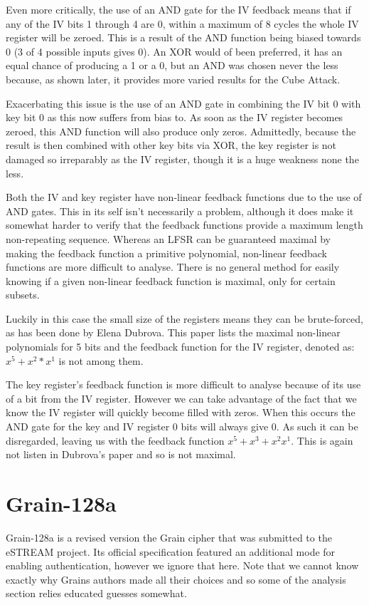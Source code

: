 \documentclass{report}
\let\Oldsection\section
\renewcommand{\section}{\FloatBarrier\Oldsection}
\begin{document}
Even more critically, the use of an AND gate for the IV feedback means that if any  of the IV bits 1 through 4 are 0, within a maximum of 8 cycles the whole IV register will be zeroed. This is a result of the AND function being biased towards 0 (3 of 4 possible inputs gives 0). An XOR would of been preferred, it has an equal chance of producing a 1 or a 0, but an AND was chosen never the less because, as shown later, it provides more varied results for the Cube Attack.

Exacerbating this issue is the use of an AND gate in combining the IV bit 0 with key bit 0 as this now suffers from bias to. As soon as the IV register becomes zeroed, this AND function will also produce only zeros. Admittedly, because the result is then combined with other key bits via XOR, the key register is not damaged so irreparably as the IV register, though it is a huge weakness none the less.

Both the IV and key register have non-linear feedback functions due to the use of AND gates. This in its self isn't necessarily a problem, although it does make it somewhat harder to verify that the feedback functions provide a maximum length non-repeating sequence. Whereas an LFSR can be guaranteed maximal by making the feedback function a primitive polynomial, non-linear feedback functions are more difficult to analyse. There is no general method for easily knowing if a given non-linear feedback function is maximal, only for certain subsets\cite{nlfsrFeedback}.

Luckily in this case the small size of the registers means they can be brute-forced, as has been done by Elena Dubrova\cite{nlfsrFeedback}. This paper lists the maximal non-linear polynomials for 5 bits and the feedback function for the IV register, denoted as: $x^5+x^2*x^1$ is not among them. 

The key register's feedback function is more difficult to analyse because of its use of a bit from the IV register. However we can take advantage of the fact that we know the IV register will quickly become filled with zeros. When this occurs the  AND gate for the key and IV register 0 bits will always give 0. As such it can be disregarded, leaving us with the feedback function $x^5+x^3+x^2x^1$. This is again not listen in Dubrova's paper and so is not maximal.
\newpage
\section{Grain-128a}
Grain-128a is a revised version the Grain cipher that was submitted to the eSTREAM project\cite{Grain128aSpec}. Its official specification featured an additional mode for enabling authentication, however we ignore that here. Note that we cannot know exactly why Grains authors made all their choices and so some of the analysis section relies educated guesses somewhat.
\begin{figure}[h]
\end{figure}
\end{document}
